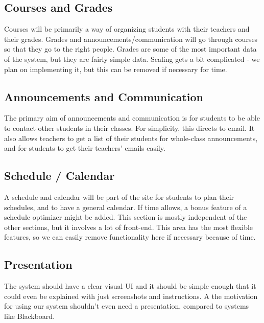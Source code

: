 \documentclass{article}
\begin{document}
\subsection{Courses and Grades}

Courses will be primarily a way of organizing students with their teachers and
their grades. Grades and announcements/communication will go through courses so
that they go to the right people. Grades are some of the most important data of
the system, but they are fairly simple data. Scaling gets a bit complicated -
we plan on implementing it, but this can be removed if necessary for time.

\subsection{Announcements and Communication}

The primary aim of announcements and communication is for students to be able
to contact other students in their classes. For simplicity, this directs to
email. It also allows teachers to get a list of their students for whole-class
announcements, and for students to get their teachers' emails easily.

\subsection{Schedule / Calendar}

A schedule and calendar will be part of the site for students to plan their
schedules, and to have a general calendar. If time allows, a bonus feature of a
schedule optimizer might be added. This section is mostly independent of the
other sections, but it involves a lot of front-end. This area has the most
flexible features, so we can easily remove functionality here if necessary
because of time.

\subsection{Presentation}

The system should have a clear visual UI and it should be simple enough that it
could even be explained with just screenshots and instructions. A the
motivation for using our system shouldn't even need a presentation, compared to
systems like Blackboard.

{} 
\end{document}
